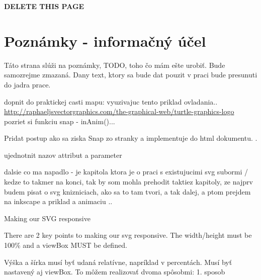 {\Huge\textbf{ DELETE THIS PAGE}}
\section{Poznámky - informačný účel}
Táto strana slúži na poznámky, TODO, toho čo mám ešte urobiť. 
Bude samozrejme zmazaná.  
Dany text, ktory sa bude dat pouzit v praci bude presunuti do jadra prace. 

dopnit do praktickej casti mapu: vyuzivajuc tento priklad ovladania.. \url{http://raphaeljsvectorgraphics.com/the-graphical-web/turtle-graphics-logo}
pozriet si funkciu snap - inAnim()...


Pridat postup ako sa ziska Snap zo stranky a implementuje do html dokumentu. .

ujednotnit nazov attribut a parameter

dalsie co ma napadlo - je kapitola \cite[p.~81]{Dawber} ktora je o praci s existujucimi svg subormi / kedze to takmer na konci, tak by som mohla prehodit taktiez kapitoly, ze najprv budem pisat o svg knizniciach, ako sa to tam tvori, a tak dalej, a ptom prejdem na inkscape a priklad a animaciu .. 


Making our SVG responsive

There are 2 key points to making our svg responsive. The width/height must be 100\% and a viewBox MUST be defined.

Výška a šírka musí byť udaná relatívne, napríklad v percentách. Musí byť nastavený aj viewBox. 
To môžem realizovať dvoma spôsobmi:
1. sposob


